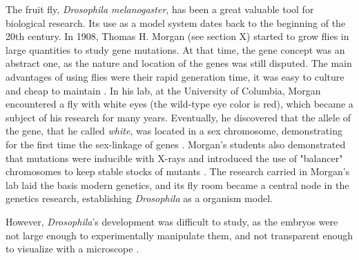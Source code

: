 The fruit fly, \textit{Drosophila melanogaster}, has been a great valuable tool for biological research.
Its use as a model system dates back to the beginning of the 20th century.
In 1908, Thomas H. Morgan (see section X) started to grow flies in large quantities to study gene mutations. At that time, the gene concept was an abstract one, as the nature and location of the genes was still disputed.
%
The main advantages of using flies were their rapid generation time, it was easy to culture and cheap to maintain \citep{Arias2008}.
%
In his lab, at the University of Columbia, Morgan encountered a fly with white eyes (the wild-type eye color is red), which became a subject of his research for many years.
Eventually, he discovered that the allele of the gene, that he called \textit{white}, was located in a sex chromosome, demonstrating for the first time the sex-linkage of genes \citep{Morgan1919}.
%
Morgan's students also demonstrated that mutations were inducible with X-rays and introduced the use of "balancer" chromosomes to keep stable stocks of mutants \citep{Arias2008}.
%
The research carried in Morgan's lab laid the basis modern genetics, and its fly room became a central node in the genetics research, establishing \textit{Drosophila} as a organism model.

However, \textit{Drosophila}'s development was difficult to study, as the embryos were not large enough to experimentally manipulate them, and not transparent enough to visualize with a microscope \citep{Gilbert2014}.


%

